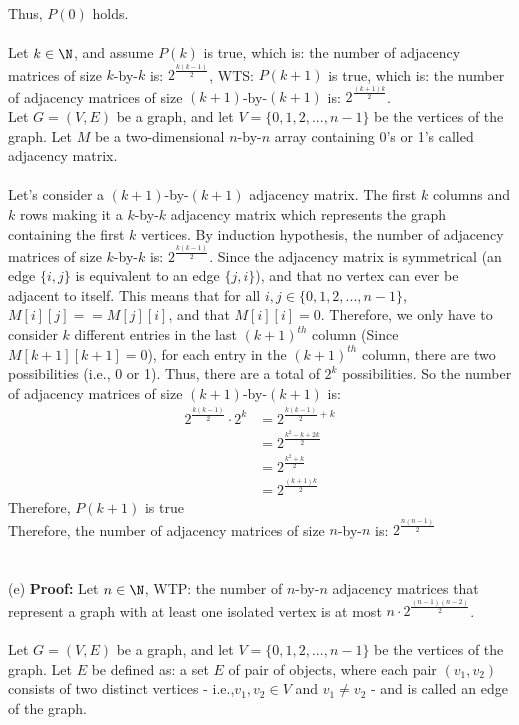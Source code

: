 \documentclass[12pt]{article}
\begin{document}
Thus, $P(0)$ holds.\\
\\
\istep\quad Let $k \in \N$, and assume $P(k)$ is true, which is: the number of adjacency matrices of size $k$-by-$k$ is: $2^{\frac{k(k-1)}{2}}$, WTS: $P(k+1)$ is true, which is: the number of adjacency matrices of size $(k+1)$-by-$(k+1)$ is: $2^{\frac{(k+1)k}{2}}$.\\
Let $G=(V,E)$ be a graph, and let $V=\{0, 1, 2,..., n-1\}$ be the vertices of the graph. Let $M$ be a two-dimensional $n$-by-$n$ array containing 0's or 1's called adjacency matrix.\\
\\
Let's consider a $(k+1)$-by-$(k+1)$ adjacency matrix. The first $k$ columns and $k$ rows making it a $k$-by-$k$ adjacency matrix which represents the graph containing the first $k$ vertices. By induction hypothesis, the number of adjacency matrices of size $k$-by-$k$ is: $2^{\frac{k(k-1)}{2}}$. Since the adjacency matrix is symmetrical (an edge $\{i,j\}$ is equivalent to an edge $\{j,i\}$), and that no vertex can ever be adjacent to itself. This means that for all $i,j\in \{0,1,2,...,n-1\}$, $M[i][j] == M[j][i]$, and that $M[i][i]=0$. Therefore, we only have to consider $k$ different entries in the last $(k+1)^{th}$ column (Since $M[k+1][k+1] = 0$), for each entry in the $(k+1)^{th}$ column, there are two possibilities (i.e., 0 or 1). Thus, there are a total of $2^k$ possibilities. So the number of adjacency matrices of size $(k+1)$-by-$(k+1)$ is:
\begin{align*}
    \tag{By induction hypothesis}
    2^{\frac{k(k-1)}{2}}\cdot 2^k &= 2^{\frac{k(k-1)}{2} + k}\\
    &= 2^{\frac{k^2-k+2k}{2}}\\
    &= 2^{\frac{k^2+k}{2}}\\
    &= 2^{\frac{(k+1)k}{2}}
\end{align*}
Therefore, $P(k+1)$ is true\\
Therefore, the number of adjacency matrices of size $n$-by-$n$ is: $2^{\frac{n(n-1)}{2}}$
\\
\\
\\
(e) \textbf{Proof:} Let $n\in \N$, WTP: the number of $n$-by-$n$ adjacency matrices that represent a graph with at least one isolated vertex is at most $n\cdot 2^{\frac{(n-1)(n-2)}{2}}$.\\
\\
Let $G=(V,E)$ be a graph, and let $V=\{0, 1, 2,..., n-1\}$ be the vertices of the graph. Let $E$ be defined as: a set $E$ of pair of objects, where each pair $(v_1, v_2)$ consists of two distinct vertices - i.e.,$v_1,v_2\in V$ and $v_1 \neq v_2$ - and is called an edge of the graph.\\
\end{document}
